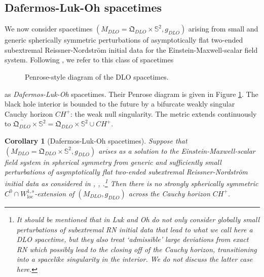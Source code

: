 \documentclass{article}
\newcommand{\loc}{\mathrm{loc}}
\newcommand{\Sp}{\mathbb{S}}
\newtheorem{cor}[definition]{Corollary}
\begin{document}
\subsection{Dafermos-Luk-Oh spacetimes}\label{DLO}
We now consider spacetimes $(M_{DLO} = \mathfrak{Q}_{DLO} \times \Sp^2,g_{DLO})$ arising from small and generic spherically symmetric perturbations of asymptotically flat two-ended subextremal Reissner-Nordstr\"{o}m initial data for the Einstein-Maxwell-scalar field system. Following \cite{Sbie22a}, we refer to this class of spacetimes
\begin{figure}
 \centering
  \def\svgwidth{7.5cm}
    
   \caption{Penrose-style diagram of the DLO spacetimes.}
   \label{FigDLO}
\end{figure}
 as \textit{Dafermos-Luk-Oh} spacetimes. Their Penrose diagram is given in Figure \ref{FigDLO}. The black hole interior is bounded to the future by a bifurcate weakly singular Cauchy horizon $CH^+$: the weak null singularity. The metric extends continuously to $\overline{\mathfrak{Q}_{DLO}} \times \Sp^2 = \mathfrak{Q}_{DLO} \times \Sp^2 \cup CH^+$.

\begin{cor}[Dafermos-Luk-Oh spacetimes]\label{cor:DLO}
Suppose that $(M_{DLO} = \mathfrak{Q}_{DLO} \times \Sp^2,g_{DLO})$ arises as a solution to the Einstein-Maxwell-scalar field system in spherical symmetry from generic and sufficiently small perturbations of asymptotically flat two-ended subextremal Reissner-Nordstr\"{o}m initial data as  considered in \cite{LukOh19I}, \cite{LukOh19II}, \cite{Gautam}.\footnote{It should be mentioned that in \cite{LukOh19I} Luk and Oh do not only consider globally small perturbations of subextremal RN initial data that lead to what we call here a DLO spacetime, but they also treat ‘admissible’ large deviations from exact RN which possibly lead to the closing off of the Cauchy horizon, transitioning into a spacelike singularity in the interior. We do not discuss
the latter case here.}  Then there is no strongly spherically symmetric $C^0\cap W^{1,s}_{\loc}$-extension of $(M_{DLO},g_{DLO})$ across the Cauchy horizon $CH^+$. 
\end{cor}
\end{document}
